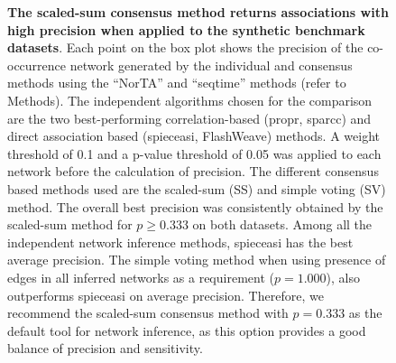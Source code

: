   \begin{figure}[H]
    \centering
    \caption{
      \textbf{The scaled-sum consensus method returns associations with high precision when applied to the synthetic benchmark datasets}.
      Each point on the box plot shows the precision of the co-occurrence network generated by the individual and consensus methods using the ``NorTA'' and ``seqtime'' methods (refer to Methods).
      The independent algorithms chosen for the comparison are the two best-performing correlation-based (propr, \ac{sparcc}) and direct association based (\ac{spieceasi}, FlashWeave) methods.
      A weight threshold of 0.1 and a p-value threshold of 0.05 was applied to each network before the calculation of precision.
      The different consensus based methods used are the scaled-sum (SS) and simple voting (SV) method.
      The overall best precision was consistently obtained by the scaled-sum method for $p \geq 0.333$ on both datasets.
      Among all the independent network inference methods, \ac{spieceasi} has the best average precision.
      The simple voting method when using presence of edges in all inferred networks as a requirement ($p = 1.000$), also outperforms \ac{spieceasi} on average precision.
      Therefore, we recommend the scaled-sum consensus method with $p = 0.333$ as the default tool for network inference, as this option provides a good balance of precision and sensitivity.
    }
    \label{fig:figure5}
  \end{figure}


